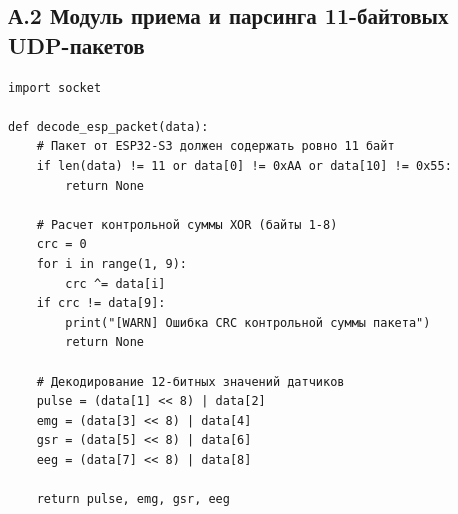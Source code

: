 \documentclass[utf8, russian]{eskdtext}
\begin{document}
\subsection*{А.2 Модуль приема и парсинга 11-байтовых UDP-пакетов}
\begin{verbatim}
import socket

def decode_esp_packet(data):
    # Пакет от ESP32-S3 должен содержать ровно 11 байт
    if len(data) != 11 or data[0] != 0xAA or data[10] != 0x55:
        return None
    
    # Расчет контрольной суммы XOR (байты 1-8)
    crc = 0
    for i in range(1, 9):
        crc ^= data[i]
    if crc != data[9]:
        print("[WARN] Ошибка CRC контрольной суммы пакета")
        return None
    
    # Декодирование 12-битных значений датчиков
    pulse = (data[1] << 8) | data[2]
    emg = (data[3] << 8) | data[4]
    gsr = (data[5] << 8) | data[6]
    eeg = (data[7] << 8) | data[8]
    
    return pulse, emg, gsr, eeg
\end{verbatim}
\end{document}
